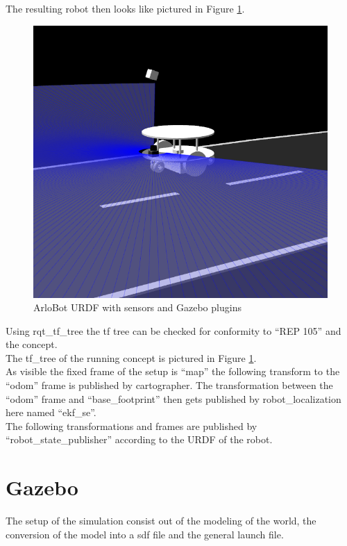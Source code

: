 The resulting robot then looks like pictured in Figure \ref{arlourdf}.

\begin{figure}[H]
	\includegraphics[width=\textwidth]{Pictures/arlourdf}
	\caption{ArloBot URDF with sensors and Gazebo plugins}
	\label{arlourdf}
\end{figure}


Using rqt\_tf\_tree the tf tree can be checked for conformity to ``REP 105'' and the concept.\\ 
The tf\_tree of the running concept is pictured in Figure \ref{}.\\
As visible the fixed frame of the setup is ``map'' the following transform to the ``odom'' frame is published by cartographer. The transformation between the ``odom'' frame and ``base\_footprint'' then gets published by robot\_localization here named ``ekf\_se''.\\
The following transformations and frames are published by ``robot\_state\_publisher'' according to the URDF of the robot.

\section{Gazebo}
The setup of the simulation consist out of the modeling of the world, the conversion of the model into a sdf file and the general launch file.

